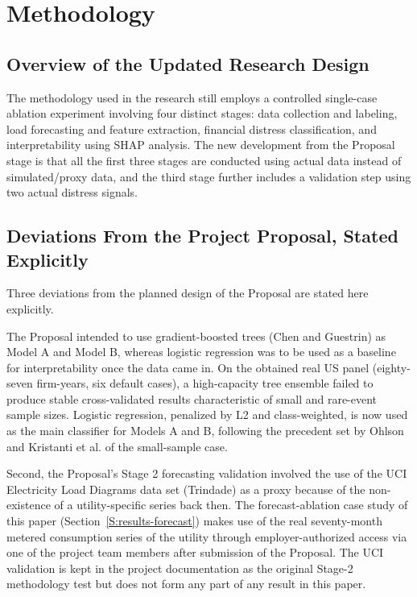 \documentclass[final,1p,times]{elsarticle}
\begin{document}

\section{Methodology}
\label{S:method}

\subsection{Overview of the Updated Research Design}

The methodology used in the research still employs a controlled single-case ablation experiment involving four distinct stages: data collection and labeling, load forecasting and feature extraction, financial distress classification, and interpretability using SHAP analysis. The new development from the Proposal stage is that all the first three stages are conducted using actual data instead of simulated/proxy data, and the third stage further includes a validation step using two actual distress signals.

\subsection{Deviations From the Project Proposal, Stated Explicitly}
\label{S:deviations}

Three deviations from the planned design of the Proposal are stated here explicitly.

The Proposal intended to use gradient-boosted trees (Chen and Guestrin) as Model A and Model B, whereas logistic regression was to be used as a baseline for interpretability once the data came in. On the obtained real US panel (eighty-seven firm-years, six default cases), a high-capacity tree ensemble failed to produce stable cross-validated results characteristic of small and rare-event sample sizes. Logistic regression, penalized by L2 and class-weighted, is now used as the main classifier for Models A and B, following the precedent set by Ohlson and Kristanti et al. of the small-sample case.

Second, the Proposal's Stage 2 forecasting validation involved the use of the UCI Electricity Load Diagrams data set (Trindade) as a proxy because of the non-existence of a utility-specific series back then. The forecast-ablation case study of this paper (Section~\ref{S:results-forecast}) makes use of the real seventy-month metered consumption series of the utility through employer-authorized access via one of the project team members after submission of the Proposal. The UCI validation is kept in the project documentation as the original Stage-2 methodology test but does not form any part of any result in this paper.
\end{document}
